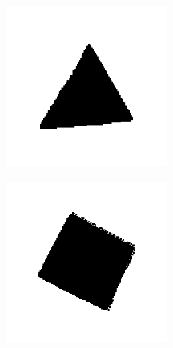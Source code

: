 \documentclass[11pt,a4paper]{article}
\begin{document}
\begin{figure}[H]
    \centering
    \begin{subfigure}[t]{0.2\textwidth}
        \centering
        \includegraphics[width=\textwidth]{res/img/triangle.png}
    \end{subfigure}
    \begin{subfigure}[t]{0.2\textwidth}
        \centering
        \includegraphics[width=\textwidth]{res/img/square.png}

\end{subfigure}
\end{figure}
\end{document}

